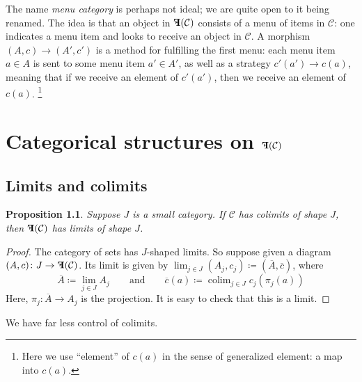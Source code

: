 \documentclass[11pt, one side, article]{memoir}
\theoremstyle{definition}
\theoremstyle{plain}
\newtheorem{proposition}[definitionx]{Proposition}
\DeclareMathOperator*{\colim}{colim}
\newcommand{\cat}[1]{\mathcal{#1}}%
\newcommand{\Cat}[1]{\mathbf{#1}}%
\newcommand{\ol}[1]{\overline{#1}}
\newcommand{\0}{\Cat{0}}
\newcommand{\1}{\Cat{1}}
\newcommand{\mn}{\reflectbox{$\Cat{F}$}}
\newcommand{\qqand}{\qquad\text{and}\qquad}
\begin{document}
The name \emph{menu category} is perhaps not ideal; we are quite open to it being renamed. The idea is that an object in $\mn(\cat{C})$ consists of a menu of items in $\cat{C}$: one indicates a menu item and looks to receive an object in $\cat{C}$. A morphism $(A,c)\to (A',c')$ is a method for fulfilling the first menu: each menu item $a\in A$ is sent to some menu item $a'\in A'$, as well as a strategy $c'(a')\to c(a)$, meaning that if we receive an element of $c'(a')$, then we receive an element of $c(a)$.%
\footnote{Here we use ``element'' of $c(a)$ in the sense of generalized element: a map into $c(a)$.}






\chapter{Categorical structures on $\mn(\cat{C})$}

\section{Limits and colimits}

\begin{proposition}\label{prop.colimits_to_limits}
Suppose $J$ is a small category. If $\cat{C}$ has colimits of shape $J$, then $\mn(\cat{C})$ has limits of shape $J$.
\end{proposition}
\begin{proof}
	The category of sets has $J$-shaped limits. So suppose given a diagram $(A,c)\colon J\to \mn(\cat{C})$. Its limit is given by $\lim_{j\in J}(A_j,c_j)\coloneqq(\ol{A},\ol{c})$, where
	\[
	\ol{A}\coloneqq\lim_{j\in J}A_j
	\qqand
	\ol{c}(a)\coloneqq\colim_{j\in J}c_j(\pi_j(a))
	\]
	Here, $\pi_j\colon \ol{A}\to A_j$ is the projection. It is easy to check that this is a limit.
\end{proof}

We have far less control of colimits.
\end{document}
